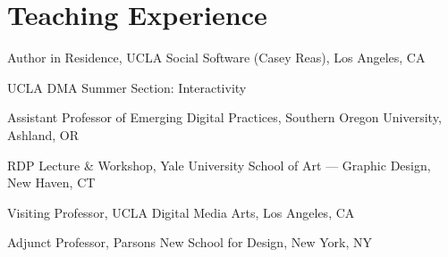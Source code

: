 \documentclass[10pt,letterpaper]{article}
\newlength{\cvyearwidth}
\newenvironment{cvlist}{%
  \begin{list}{}{%
    \setlength{\leftmargin}{\cvyearwidth}%
    \setlength{\labelwidth}{\cvyearwidth}%
    \setlength{\labelsep}{0.4em}%
    \setlength{\itemsep}{0.15em}%
    \setlength{\parsep}{0pt}%
    \setlength{\topsep}{0.2em}%
    \renewcommand{\makelabel}[1]{\color{acgray}\small ##1\hfill}%
  }%
}{\end{list}}
\newcommand{\cv}[2]{\item[#1] #2}
\begin{document}
\section*{Teaching Experience}
\begin{cvlist}
  \cv{2026}{Author in Residence, UCLA Social Software (Casey Reas), Los Angeles, CA}
  \cv{2024}{UCLA DMA Summer Section: Interactivity}
  \cv{2019}{Assistant Professor of Emerging Digital Practices, Southern Oregon University, Ashland, OR}
  \cv{2017}{RDP Lecture \& Workshop, Yale University School of Art --- Graphic Design, New Haven, CT}
  \cv{2016}{Visiting Professor, UCLA Digital Media Arts, Los Angeles, CA}
  \cv{2013--2016}{Adjunct Professor, Parsons New School for Design, New York, NY}
\end{cvlist}

\par{}\baselineskip{}\baselineskip\relax
\end{document}
